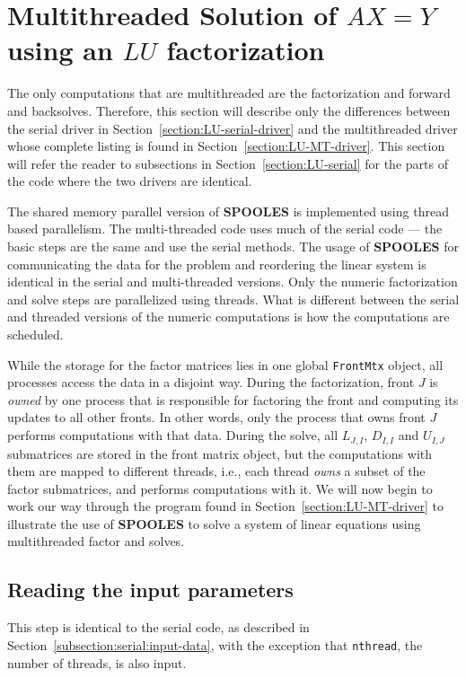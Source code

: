 \vfill \eject
\par
\section{Multithreaded Solution of $A X = Y$ 
         using an $LU$ factorization}
\label{section:LU-MT}
\par
The only computations that are multithreaded are the factorization
and forward and backsolves.
Therefore, this section will describe only the differences between
the serial driver in Section~\ref{section:LU-serial-driver} and the
multithreaded driver whose complete listing is found in
Section~\ref{section:LU-MT-driver}.
This section will refer the reader to subsections in
Section~\ref{section:LU-serial} for the parts of the code where the
two drivers are identical.
\par
The shared memory parallel version of {\bf SPOOLES} is implemented
using thread based parallelism.  
The multi-threaded code uses much of
the serial code --- the basic steps are the same and use
the serial methods.  
The usage of {\bf SPOOLES} for communicating 
the data for the problem and reordering the linear system 
is identical in the serial and multi-threaded versions.
Only the numeric factorization and solve steps are
parallelized using threads.
What is different between the serial and threaded versions of the
numeric computations is how the computations are scheduled.
\par
While the storage for the factor matrices lies in one global
{\tt FrontMtx} object, all processes access the data in a disjoint way.
During the factorization, front $J$ is {\it owned} by one process 
that is responsible for factoring the front and computing its updates 
to all other fronts.  
In other words, only the process that owns 
front $J$ performs computations with that data.
During the solve, all $L_{J,I}$, $D_{I,I}$ and $U_{I,J}$
submatrices are stored in the front matrix object,
but the computations with them are mapped to different threads,
i.e., each thread {\it owns} a subset of the factor submatrices,
and performs computations with it.
We will now begin to work our way through the program 
found in Section~\ref{section:LU-MT-driver}
to illustrate the use of {\bf SPOOLES} to solve a system 
of linear equations using multithreaded factor and solves.  
\par
\subsection{Reading the input parameters}
\label{subsection:MT:input-data}
\par
This step is identical to the serial code, as described in
Section~\ref{subsection:serial:input-data}, with the exception
that {\tt nthread}, the number of threads, is also input.
\par
